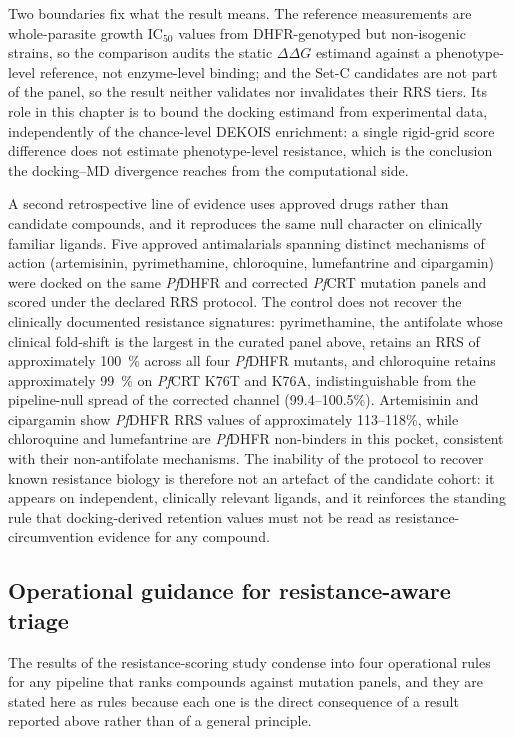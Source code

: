 Two boundaries fix what the result means. The reference measurements are whole-parasite growth IC$_{50}$ values from DHFR-genotyped but non-isogenic strains, so the comparison audits the static $\Delta\Delta G$ estimand against a phenotype-level reference, not enzyme-level binding; and the Set-C candidates are not part of the panel, so the result neither validates nor invalidates their RRS tiers. Its role in this chapter is to bound the docking estimand from experimental data, independently of the chance-level DEKOIS enrichment: a single rigid-grid score difference does not estimate phenotype-level resistance, which is the conclusion the docking--MD divergence reaches from the computational side.

A second retrospective line of evidence uses approved drugs rather than candidate compounds, and it reproduces the same null character on clinically familiar ligands. Five approved antimalarials spanning distinct mechanisms of action (artemisinin, pyrimethamine, chloroquine, lumefantrine and cipargamin) were docked on the same \emph{Pf}DHFR and corrected \emph{Pf}CRT mutation panels and scored under the declared RRS protocol. The control does not recover the clinically documented resistance signatures: pyrimethamine, the antifolate whose clinical fold-shift is the largest in the curated panel above, retains an RRS of approximately \qty{100}{\percent} across all four \emph{Pf}DHFR mutants, and chloroquine retains approximately \qty{99}{\percent} on \emph{Pf}CRT K76T and K76A, indistinguishable from the pipeline-null spread of the corrected channel (\numrange{99.4}{100.5}\%). Artemisinin and cipargamin show \emph{Pf}DHFR RRS values of approximately \numrange{113}{118}\%, while chloroquine and lumefantrine are \emph{Pf}DHFR non-binders in this pocket, consistent with their non-antifolate mechanisms. The inability of the protocol to recover known resistance biology is therefore not an artefact of the candidate cohort: it appears on independent, clinically relevant ligands, and it reinforces the standing rule that docking-derived retention values must not be read as resistance-circumvention evidence for any compound.

\subsection{Operational guidance for resistance-aware triage}

The results of the resistance-scoring study condense into four operational rules for any pipeline that ranks compounds against mutation panels, and they are stated here as rules because each one is the direct consequence of a result reported above rather than of a general principle.

